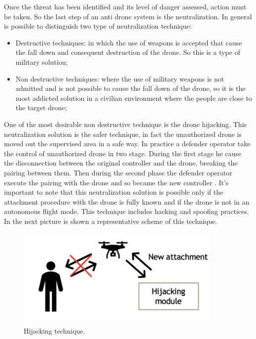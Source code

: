 Once the threat has been identified and its level of danger assessed, action must be taken. So the last step of an anti drone system is the neutralization. In general is possible to distinguish two type of neutralization technique:
\begin{itemize}
     \item Destructive techniques: in which the use of weapons is accepted that cause the fall down and consequent destruction of the drone. So this is a type of military solution;
         
    \item Non destructive techniques: where the use of military weapons is not admitted and is not possible to cause the fall down of the drone, so it is the most addicted solution in a civilian environment where the people are close to the target drone;

\end{itemize}

One of the most desirable non destructive technique is the drone hijacking. This neutralization solution is the safer technique, in fact the unauthorized drone is moved out the supervised area in a safe way. In practice a defender operator take the control of unauthorized drone in two stage. During the first stage he cause the disconnection between the original controller and the drone, breaking the pairing between them. Then during the second phase the defender operator execute the pairing with the drone and so became the new controller \cite{survey}. It's important to note that this neutralization solution is possible only if the attachment procedure with the drone is fully known and if the drone is not in an autonomous flight mode. This technique includes hacking and spoofing practices. In the next picture is shown a representative scheme of this technique.

\begin{figure}[h!]
    \centering
    \includegraphics[width=10cm]{imgs/Drone hijacking.png}
    \caption{Hijacking technique.}
\end{figure}


